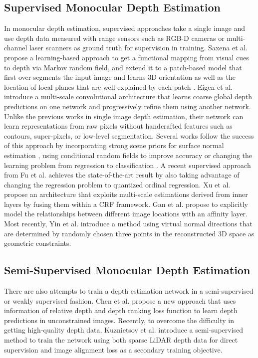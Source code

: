 \documentclass[10pt,twocolumn,letterpaper]{article}
\begin{document}
\subsection{Supervised Monocular Depth Estimation}
In monocular depth estimation, supervised approaches take a single image and use depth data measured with range sensors such as RGB-D cameras or multi-channel laser scanners as ground truth for supervision in training.
Saxena et al. \cite{saxena2006learning} propose a learning-based approach to get a functional mapping from visual cues to depth via Markov random field, and extend it to a patch-based model that first over-segments the input image and learns 3D orientation as well as the location of local planes that are well explained by each patch \cite{saxena2009make3d}.
Eigen et al. \cite{eigen2015predicting} introduce a multi-scale convolutional architecture that learns coarse global depth predictions on one network and progressively refine them using another network.
Unlike the previous works in single image depth estimation, their network can learn representations from raw pixels without handcrafted features such as contours, super-pixels, or low-level segmentation.
Several works follow the success of this approach by incorporating strong scene priors for surface normal estimation \cite{wang2015designing}, using conditional random fields to improve accuracy \cite{li2015depth,knobelreiter2017end,schwing2015fully} or changing the learning problem from regression to classification \cite{cao2017estimating}.
A recent supervised approach from Fu et al. \cite{fu2018deep} achieves the state-of-the-art result by also taking advantage of changing the regression problem to quantized ordinal regression.
Xu et al. \cite{xu2017multi} propose an architecture that exploits multi-scale estimations derived from inner layers by fusing them within a CRF framework.
Gan et al. \cite{gan2018monocular} propose to explicitly model the relationships between different image locations with an affinity layer.
Most recently, Yin et al. \cite{yin2019enforcing} introduce a method using virtual normal directions that are determined by randomly chosen three points in the reconstructed 3D space as geometric constraints.

\subsection{Semi-Supervised Monocular Depth Estimation}
There are also attempts to train a depth estimation network in a semi-supervised or weakly supervised fashion.
Chen et al. \cite{chen2016single} propose a new approach that uses information of relative depth and depth ranking loss function to learn depth predictions in unconstrained images.
Recently, to overcome the difficulty in getting high-quality depth data, Kuznietsov et al. \cite{kuznietsov2017semi} introduce a semi-supervised method to train the network using both sparse LiDAR depth data for direct supervision and image alignment loss as a secondary training objective.
\end{document}
